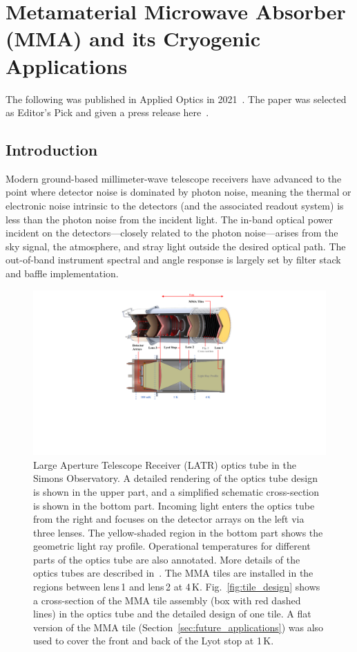 \chapter{Metamaterial Microwave Absorber (MMA) and its Cryogenic Applications}
\label{ch:mma}
The following was published in Applied Optics in 2021~\cite{Xu_2021}.  The paper was selected as Editor's Pick and given a press release here~\cite{MMApress}.

\section{Introduction}
Modern ground-based millimeter-wave telescope receivers have advanced to the point where detector noise is dominated by photon noise, meaning the thermal or electronic noise intrinsic to the detectors (and the associated readout system) is less than the photon noise from the incident light. The in-band optical power incident on the detectors---closely related to the photon noise---arises from the sky signal, the atmosphere, and stray light outside the desired optical path. The out-of-band instrument spectral and angle response is largely set by filter stack and baffle implementation.

\begin{figure}
    \centering
    \includegraphics[width = .9\textwidth]{Figures/latr_ot.pdf}
    \caption{Large Aperture Telescope Receiver (LATR) optics tube in the Simons Observatory. A detailed rendering of the optics tube design is shown in the upper part, and a simplified schematic cross-section is shown in the bottom part. Incoming light enters the optics tube from the right and focuses on the detector arrays on the left via three lenses. The yellow-shaded region in the bottom part shows the geometric light ray profile. Operational temperatures for different parts of the optics tube are also annotated. More details of the optics tubes are described in~\cite{xu/etal:2020c}. The MMA tiles are installed in the regions between lens\,1 and lens\,2 at 4\,K. Fig.~\ref{fig:tile_design} shows a cross-section of the MMA tile assembly (box with red dashed lines) in the optics tube and the detailed design of one tile. A flat version of the MMA tile (Section~\ref{sec:future_applications}) was also used to cover the front and back of the Lyot stop at 1\,K.}
    \label{fig:latr_ot}
\end{figure}

